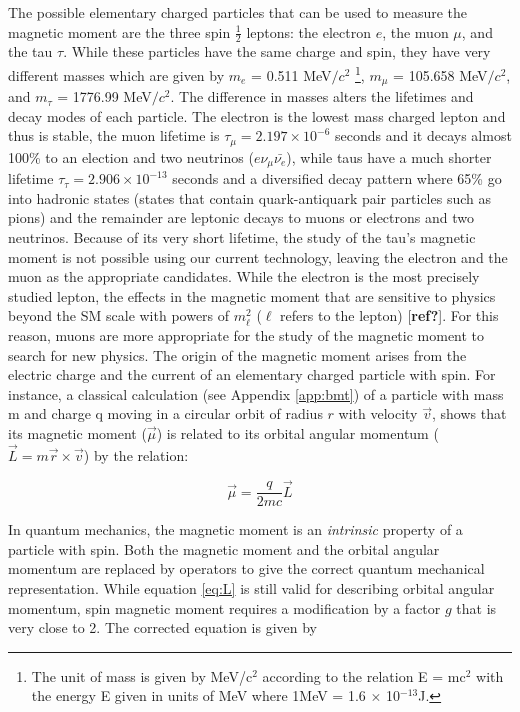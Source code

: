 \documentclass{outhesis}
\begin{document}
The possible elementary charged particles that can be used to measure the magnetic moment are the three spin $\frac{1}{2}$ leptons: the electron $e$, the muon $\mu$, and the tau $\tau$. While these particles have the same charge and spin, they have very different masses which are given by $m_e$ = 0.511 MeV$/c^2$ \footnote{The unit of mass is given by MeV/c$^2$ according to the relation E = mc$^2$ with the energy E given in units of MeV where 1MeV = 1.6 $\times$ 10$^{-13}$J.}, $m_{\mu}$ = 105.658 MeV$/c^2$, and $m_{\tau}$ = 1776.99 MeV$/c^2$. The difference in masses alters the lifetimes and decay modes of each particle. The electron is the lowest mass charged lepton and thus is stable, the muon lifetime is $\tau_{\mu} = 2.197 \times 10^{-6}$ seconds and it decays almost 100\% to an election and two neutrinos ($e\nu_{\mu}\bar{\nu_{e}}$), while taus have a much shorter lifetime $\tau_{\tau} = 2.906 \times 10^{-13}$ seconds and a diversified decay pattern where 65\% go into hadronic states (states that contain quark-antiquark pair particles such as pions) and the remainder are leptonic decays to muons or electrons and two neutrinos. Because of its very short lifetime, the study of the tau's magnetic moment is not possible using our current technology, leaving the electron and the muon as the appropriate candidates. While the electron is the most precisely studied lepton, the effects in the magnetic moment that are sensitive to physics beyond the SM scale with powers of $m_\ell^2$ ($\ell$ refers to the lepton) [\textbf{ref?}]. For this reason, muons are more appropriate for the study of the magnetic moment to search for new physics. 
The origin of the magnetic moment arises from the electric charge and the current of an elementary charged particle with spin. For instance, a classical calculation (see Appendix \ref{app:bmt}) of a particle with mass m and charge q moving in a circular orbit of radius $r$ with velocity $\overrightarrow{v}$, shows that its magnetic moment ($\overrightarrow{\mu}$) is related to its orbital angular momentum ($\overrightarrow{L} =m\overrightarrow{r} \times \overrightarrow{v}$) by the relation:

\begin{equation}
\overrightarrow{\mu} = \frac{q}{2mc} \overrightarrow{L}
  \label{eq:L}
\end{equation}

In quantum mechanics, the magnetic moment is an \emph{intrinsic} property of a particle with spin. Both the magnetic moment and the orbital angular momentum are replaced by operators to give the correct quantum mechanical representation. While equation \ref{eq:L} is still valid for describing orbital angular momentum, spin magnetic moment requires a modification by a factor $g$ that is very close to 2. The corrected equation is given by
\end{document}
